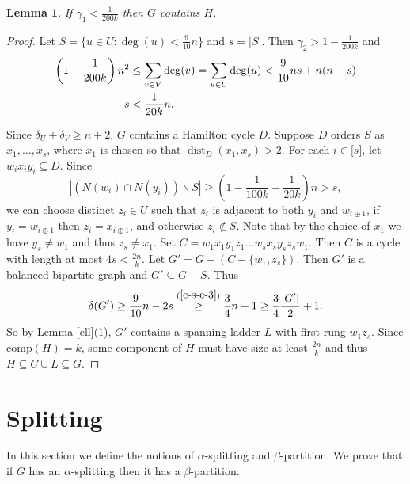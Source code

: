 \documentclass[oneside,12pt]{memoir}
\newtheorem{lemma}[theorem]{Lemma}
\newcommand{\g}{\gamma}
\begin{document}
\begin{lemma}\label{preext} If $\g_{1}<\frac{1}{200k}$ then $G$
contains $H$. \end{lemma}

\begin{proof} Let $S=\{u\in U:\deg(u)<\frac{9}{10}n\}$ and $s=\left\vert S\right\vert $.
Then $\gamma_{2}>1-\frac{1}{200k}$ and 
\begin{align}
\left(1-\frac{1}{200k}\right)n^{2}&\leq\sum_{v\in V}\deg(v)=\sum_{u\in U}\deg(u)<\frac{9}{10}ns +n(n-s)\notag\\
s &<\frac{1}{20k}n.\label{e-s-e-3}
\end{align}

 Since $\delta_{U}+\delta_{V}\geq n+2$, $G$ contains a Hamilton
cycle $D$. Suppose $D$ orders $S$ as $x_{1},\dots,x_{s}$,  where  $x_{1}$ is chosen so that $\operatorname*{dist}_{D}(x_{1},x_{s})>2$.
For each $i\in\lbrack s]$, let  $w_{i}x_{i}y_{i}\subseteq D$.
Since\[
|(N(w_{i})\cap N(y_{i}))\smallsetminus S|\geq\left(1-\frac{1}{100k}-\frac{1}{20k}\right)n>s,\]
we can choose distinct $z_{i}\in U$ such that $z_{i}$ is adjacent
to both $y_{i}$ and $w_{i\oplus1}$, if $y_{i}=w_{i\oplus1}$ then $z_{i}=x_{i\oplus1}$,
and otherwise $z_{i}\notin S$. Note that by the choice
of $x_{1}$ we have $y_{s}\neq w_{1}$ and thus $z_{s}\neq x_{1}$.
Set 
$C=w_1x_1y_1z_1\dots w_sx_sy_sz_sw_1$. 
Then $C$ is a cycle with length at most $4s<\frac{2n}{k}$.
Let $G'=G-(C-\{w_{1},z_{s}\})$.  Then $G'$ is
a balanced bipartite graph and  $G'\subseteq G-S$. Thus $$\delta(G')\geq\frac{9}{10}n-2s\stackrel{(\ref{e-s-e-3})}{\geq}\frac{3}{4}n+1\geq\frac{3}{4}\frac{|G'|}{2}+1.$$
So by Lemma \ref{ell}(1), $G'$ contains a spanning ladder $L$ with first rung
$w_{1}z_{s}$. Since $\mathrm{comp}(H)=k$, some component of $H$ must have size at least $\frac{2n}{k}$ and thus $H\subseteq C\cup L\subseteq G$.
\end{proof}

\section{Splitting}

In this section we define the notions of $\alpha$-splitting and $\beta$-partition. We prove that if $G$ has an $\alpha$-splitting then it has a $\beta$-partition.%
\end{document}
